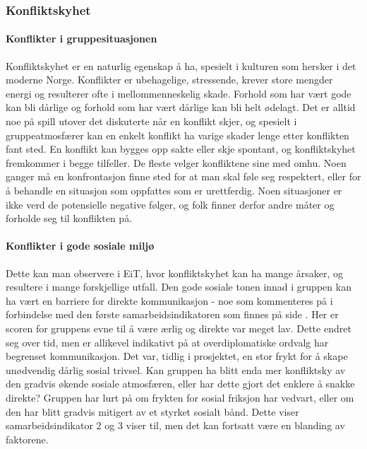 \subsubsection{Konfliktskyhet}

\paragraph{Konflikter i gruppesituasjonen}
Konfliktskyhet er en naturlig egenskap å ha, spesielt i kulturen som hersker i det moderne Norge.
Konflikter er ubehagelige, stressende, krever store mengder energi og resulterer ofte i mellommenneskelig skade.
Forhold som har vært gode kan bli dårlige og forhold som har vært dårlige kan bli helt ødelagt.
Det er alltid noe på spill utover det diskuterte når en konflikt skjer, og spesielt i gruppeatmosfærer kan en enkelt konflikt ha varige skader lenge etter konflikten fant sted. 
En konflikt kan bygges opp sakte eller skje spontant, og konfliktskyhet fremkommer i begge tilfeller. 
De fleste velger konfliktene sine med omhu. Noen ganger må en konfrontasjon finne sted for at man skal føle seg respektert, eller for å behandle en situasjon som oppfattes som er urettferdig. 
Noen situasjoner er ikke verd de potensielle negative følger, og folk finner derfor andre måter og forholde seg til konflikten på. 
\\
\paragraph{Konflikter i gode sosiale miljø}
Dette kan man observere i EiT, hvor konfliktskyhet kan ha mange årsaker, og resultere i mange forskjellige utfall.
Den gode sosiale tonen innad i gruppen kan ha vært en barriere for direkte kommunikasjon - noe som kommenteres på i forbindelse med den første samarbeidsindikatoren som finnes på side \pageref{samarbeidsindikator1}. 
Her er scoren for gruppens evne til å være ærlig og direkte var meget lav.
Dette endret seg over tid, men er allikevel indikativt på at overdiplomatiske ordvalg har begrenset kommunikasjon.
Det var, tidlig i prosjektet, en stor frykt for å skape unødvendig dårlig sosial trivsel. 
Kan gruppen ha blitt enda mer konfliktsky av den gradvis økende sosiale atmosfæren, eller har dette gjort det enklere å snakke direkte?
Gruppen har lurt på om frykten for sosial friksjon har vedvart, eller om den har blitt gradvis mitigert av et styrket sosialt bånd.
Dette viser samarbeidsindikator 2 og 3 viser til, men det kan fortsatt være en blanding av faktorene. 
\\
